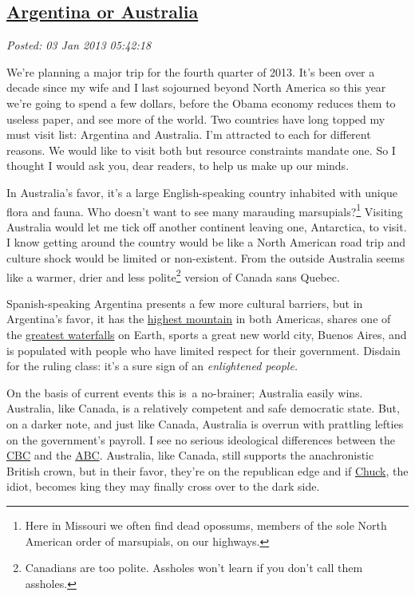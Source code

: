 %

\subsection*{\href{http://bakerjd99.wordpress.com/2013/01/02/argentina-or-australia/}{Argentina or Australia}}


\noindent\emph{Posted: 03 Jan 2013 05:42:18}
\vspace{6pt}

We're planning a major trip for the fourth quarter of 2013. It's been
over a decade since my wife and I last sojourned beyond North America so
this year we're going to spend a few dollars, before the Obama economy
reduces them to useless paper, and see more of the world. Two countries
have long topped my must visit list: Argentina and Australia. I'm
attracted to each for different reasons. We would like to visit both but
resource constraints mandate one. So I thought I would ask you, dear
readers, to help us make up our minds.

In Australia's favor, it's a large English-speaking country inhabited
with unique flora and fauna. Who doesn't want to see many marauding
marsupials?\footnote{ Here in Missouri we often find dead opossums, members of the sole
  North American order of marsupials, on our
  highways.
} Visiting Australia would
let me tick off another continent leaving one, Antarctica, to visit. I
know getting around the country would be like a North American road trip
and culture shock would be limited or non-existent. From the outside
Australia seems like a warmer, drier and less
polite\footnote{Canadians are too polite. Assholes won't learn if you don't call them
  assholes.
} version of Canada sans Quebec.

Spanish-speaking Argentina presents a few more cultural barriers, but in
Argentina's favor, it has the
\href{http://www.aconcagua.com/about-aconcagua/location/}{highest
mountain} in both Americas, shares one of the
\href{http://www.worldwaterfalldatabase.com/waterfall/Iguazu-Cataratas-del-109/}{greatest
waterfalls} on Earth, sports a great new world city, Buenos Aires, and
is populated with people who have limited respect for their government.
Disdain for the ruling class: it's a sure sign of an \emph{enlightened
people.}

On the basis of current events this is~a no-brainer; Australia easily
wins. Australia, like Canada, is a relatively competent and safe
democratic state. But, on a darker note, and just like Canada, Australia
is overrun with prattling lefties on the government's payroll. I see no
serious ideological differences between the
\href{http://www.cbc.ca/}{CBC} and the
\href{http://www.abc.net.au/}{ABC}. Australia, like Canada, still
supports the anachronistic British crown, but in their favor, they're on
the republican edge and if
\href{http://www.spectator.co.uk/columnists/james-delingpole/6157403/is-prince-charles-illadvised-or-merely-idiotic/}{Chuck},
the idiot, becomes king they may finally cross over to the dark side.

